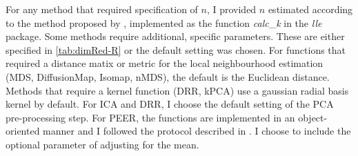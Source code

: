 For any method that required specification of \(n\), I provided \(n\) estimated according to the method proposed by \citet{Kayo2006}, implemented as the function \textit{calc}\_\textit{k} in the \textit{lle} package. Some methods require additional, specific parameters. These are either specified in \cref{tab:dimRed-R} or the default setting was chosen. For functions that required a distance matix or metric for the local neighbourhood estimation (MDS, DiffusionMap, Isomap, nMDS), the default is the Euclidean distance. Methods that require a kernel function (DRR, kPCA) use a gaussian radial basis kernel by default. For ICA and DRR, I choose the default setting of the PCA pre-processing step. For PEER, the functions are implemented in an object-oriented manner and I followed the protocol described in \citet{Stegle2012}. I choose to include the optional parameter of adjusting for the mean.  
%
